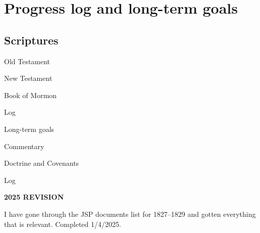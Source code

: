 \section{Progress log and long-term goals}
	\label{LOG}
	
	\subsection{Scriptures}
	
		\begin{compactitem}
			
			\item Old Testament
				\begin{compactitem}
					\item 
				\end{compactitem}
				
			\item New Testament
				\begin{compactitem}
					\item 
				\end{compactitem}
				
			\item Book of Mormon
				\begin{compactitem}
				
					\item Log
						\begin{compactitem}
							\item 
						\end{compactitem}
					
					\item Long-term goals
						\begin{compactitem}
							\item Commentary
						\end{compactitem}
					
				\end{compactitem}
				
			\item Doctrine and Covenants
				\begin{compactitem}
				
					\item Log
						\begin{compactitem}
						
							\item \textbf{2025 REVISION}
								\begin{compactitem}
									\item I have gone through the JSP documents list for 1827--1829 and gotten everything that is relevant. Completed 1/4/2025.
								\end{compactitem}
								

\end{compactitem}
\end{compactitem}
\end{compactitem}
